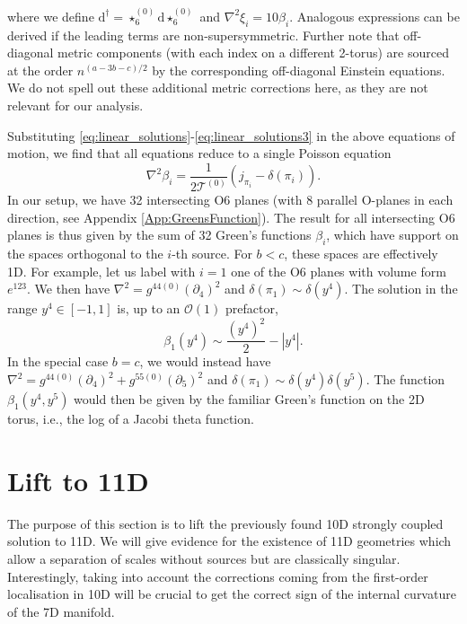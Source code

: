 \documentclass[11pt]{article}
\renewcommand{\[}{\left[}
\renewcommand{\]}{\right]}
\renewcommand{\(}{\left(}
\renewcommand{\)}{\right)}
\renewcommand{\d}{\textrm{d}}
\newcommand{\<}{\langle}
\renewcommand{\>}{\rangle}
\begin{document}
where we define $\d^\dagger=\star_6^{(0)} \d \star_6^{(0)}$ and
$\nabla^2 \xi_i = 10 \beta_i$. Analogous expressions can be derived if the leading terms are non-supersymmetric.
Further note that off-diagonal metric components (with each index on a different 2-torus) are sourced at the order $n^{(a-3b-c)/2}$ by the corresponding off-diagonal Einstein equations. We do not spell out these additional metric corrections here, as they are not relevant for our analysis.


Substituting \eqref{eq:linear_solutions}-\eqref{eq:linear_solutions3} in the above equations of motion, we find that all equations reduce to a single Poisson equation
\begin{equation}
\nabla^2 \beta_i = \frac{1}{2\mathcal{T}^{(0)}} \left( j_{\pi_i}- \delta(\pi_i) \right).
\end{equation}
In our setup, we have 32 intersecting O6 planes (with 8 parallel O-planes in each direction, see Appendix \ref{App:GreensFunction}). The result for all intersecting O6 planes is thus given by the sum of 32 Green's functions $\beta_i$, which have support on the spaces orthogonal to the $i$-th source.
For $b<c$, these spaces are effectively 1D.
For example, let us label with $i=1$ one of the O6 planes with volume form $e^{123}$. We then have $\nabla^2= g^{44(0)} (\partial_4)^2$ and $\delta(\pi_1)\sim \delta(y^4)$. The solution in the range $y^4\in[-1,1]$ is, up to an $\mathcal{O}(1)$ prefactor,
\begin{equation}
\beta_1(y^4) \sim \frac{(y^4)^2}{2}-|y^4|. \label{xx}
\end{equation}
In the special case $b=c$, we would instead have $\nabla^2= g^{44(0)} (\partial_4)^2+g^{55(0)} (\partial_5)^2$ and $\delta(\pi_1)\sim \delta(y^4)\delta(y^5)$. The function $\beta_1(y^4,y^5)$ would then be given by the familiar Green's function on the 2D torus, i.e., the log of a Jacobi theta function.


\section{Lift to 11D}
\label{lift}

The purpose of this section is to lift the previously found 10D strongly coupled solution to 11D. We will give evidence for the existence of 11D geometries which allow a separation of scales without sources but are classically singular. Interestingly, taking into account the corrections coming from the first-order localisation in 10D will be crucial to get the correct sign of the internal curvature of the 7D manifold.
\end{document}
